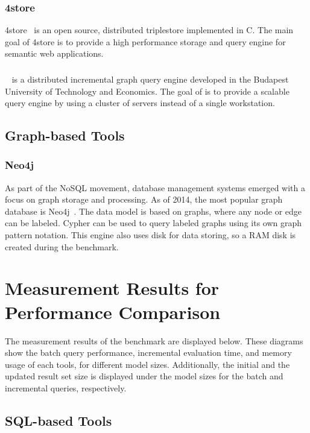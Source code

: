 \subsubsection{4store}
4store~\cite{harris20094store} is an open source, distributed triplestore implemented in C. The main goal of 4store is to provide a high performance storage and query engine for semantic web applications. 

\subsubsection{\iqd}
\iqd{}~\cite{Izso:2013:IIG:2487766.2487772} is a distributed incremental graph query engine developed in the Budapest University of Technology and Economics. The goal of \iqd{} is to provide a scalable query engine by using a cluster of servers instead of a single workstation.


\subsection{Graph-based Tools}

\subsubsection{Neo4j}
As part of the NoSQL movement, database management systems emerged with a focus on graph storage and processing. As of 2014, the most popular graph database is 
Neo4j~\cite{neo4j}. The data model is based on graphs, where any node or edge can be labeled. Cypher can be used to query labeled graphs using its own graph pattern notation. This engine also uses disk for data storing, so a RAM disk is created during the benchmark.

\section{Measurement Results for Performance Comparison}
\label{sec:results}

The measurement results of the benchmark are displayed below. These diagrams show the batch query performance, incremental evaluation time, and memory usage of each tools, for different model sizes. Additionally, the initial and the updated result set size is displayed under the model sizes for the batch and incremental queries, respectively.

\subsection{SQL-based Tools}

